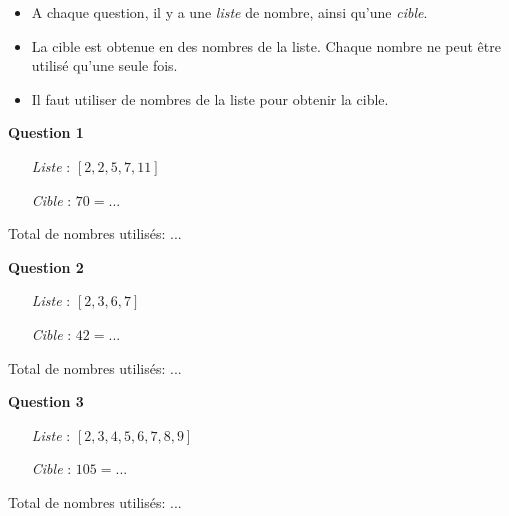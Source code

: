 \documentclass[a4paper,12pt]{article}
\title{}
\date{14 septembre 2021}
\begin{document}
\noindent\textbf{\huge {}}
\vspace{1em}

\makeatletter
\@date
\makeatother
\strut\newline

\begin{greybox}[frametitle={Consignes}]
	\begin{itemize}
		\item A chaque question, il y a une \textit{liste} de nombre, ainsi qu'une \textit{cible}.
		\item La cible est obtenue en  des nombres de la liste. Chaque nombre ne peut être utilisé qu'une seule fois.
		\item Il faut utiliser  de nombres de la liste pour obtenir la cible.
	\end{itemize}
\end{greybox}

\textbf{Question 1} \\
\begin{itemize}
	\setlength\itemsep{0.3em}
	\item[\textit{Liste}]: $[2, 2, 5, 7, 11]$
	\item[\textit{Cible}]: $70 = ...$
\end{itemize}
\vspace{0.2cm}
Total de nombres utilisés: ...
\vspace{0.8cm}

\textbf{Question 2} \\
\begin{itemize}
	\setlength\itemsep{0.3em}
	\item[\textit{Liste}]: $[2, 3, 6, 7]$
	\item[\textit{Cible}]: $42 = ...$
\end{itemize}
\vspace{0.2cm}
Total de nombres utilisés: ...
\vspace{0.8cm}

\textbf{Question 3} \\
\begin{itemize}
	\setlength\itemsep{0.3em}
	\item[\textit{Liste}]: $[2, 3, 4, 5, 6, 7, 8, 9]$
	\item[\textit{Cible}]: $105 = ...$
\end{itemize}
\vspace{0.2cm}
Total de nombres utilisés: ...
\vspace{0.8cm}
\end{document}
